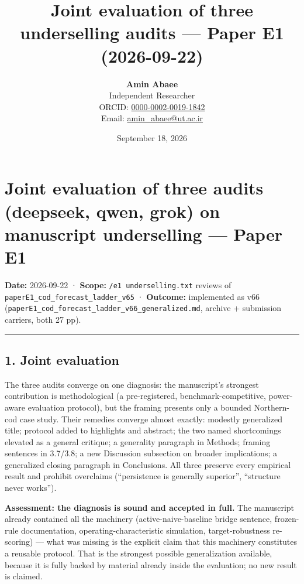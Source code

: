 \documentclass[11pt]{article}
\title{Joint evaluation of three underselling audits — Paper E1 (2026-09-22)}
\author{\textbf{Amin Abaee}\\ Independent Researcher\\[2pt] ORCID: \href{https://orcid.org/0000-0002-0019-1842}{0000-0002-0019-1842}\\ Email: \href{mailto:amin_abaee@ut.ac.ir}{amin_abaee@ut.ac.ir}}
\date{September 18, 2026}
\begin{document}
\maketitle

\section{Joint evaluation of three audits (deepseek, qwen, grok) on
manuscript underselling --- Paper
E1}\label{joint-evaluation-of-three-audits-deepseek-qwen-grok-on-manuscript-underselling-paper-e1}

\textbf{Date:} 2026-09-22 · \textbf{Scope:}
\texttt{/e1\ underselling.txt} reviews of
\texttt{paperE1\_cod\_forecast\_ladder\_v65} · \textbf{Outcome:}
implemented as v66
(\texttt{paperE1\_cod\_forecast\_ladder\_v66\_generalized.md}, archive +
submission carriers, both 27 pp).

\begin{center}\rule{0.5\linewidth}{0.5pt}\end{center}

\subsection{1. Joint evaluation}\label{joint-evaluation}

The three audits converge on one diagnosis: the manuscript's strongest
contribution is methodological (a pre-registered, benchmark-competitive,
power-aware evaluation protocol), but the framing presents only a
bounded Northern-cod case study. Their remedies converge almost exactly:
modestly generalized title; protocol added to highlights and abstract;
the two named shortcomings elevated as a general critique; a generality
paragraph in Methods; framing sentences in 3.7/3.8; a new Discussion
subsection on broader implications; a generalized closing paragraph in
Conclusions. All three preserve every empirical result and prohibit
overclaims (``persistence is generally superior'', ``structure never
works'').

\textbf{Assessment: the diagnosis is sound and accepted in full.} The
manuscript already contained all the machinery (active-naive-baseline
bridge sentence, frozen-rule documentation, operating-characteristic
simulation, target-robustness re-scoring) --- what was missing is the
explicit claim that this machinery constitutes a reusable protocol. That
is the strongest possible generalization available, because it is fully
backed by material already inside the evaluation; no new result is
claimed.
\end{document}
